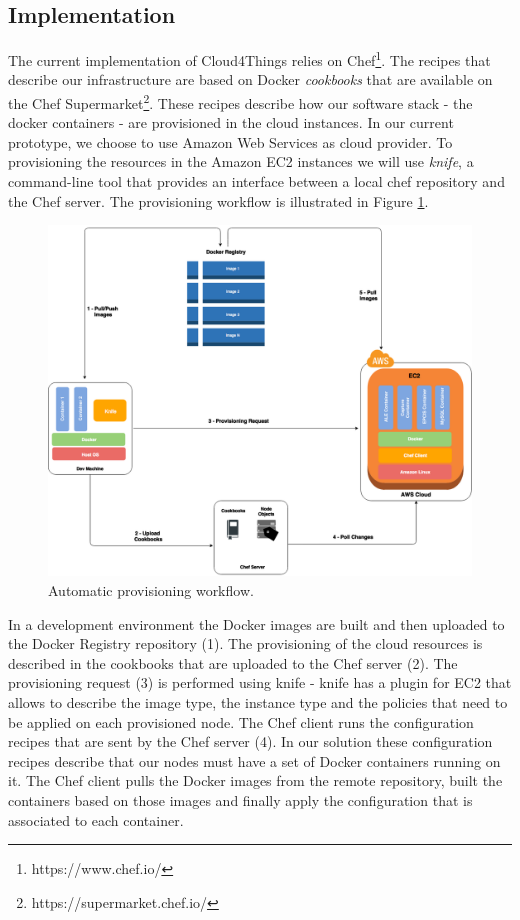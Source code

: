 \subsection{Implementation}
\label{sub:implementation}
The current implementation of Cloud4Things relies on Chef\footnote{https://www.chef.io/}. The recipes that describe our
infrastructure are based on Docker \textit{cookbooks} that are available on the Chef Supermarket\footnote{https://supermarket.chef.io/}.
These recipes describe how our software stack - the docker containers - are provisioned in the cloud instances.
In our current prototype, we choose to use Amazon Web Services as cloud provider. To provisioning the
resources in the Amazon EC2 instances we will use \textit{knife}, a command-line tool that provides
an interface between a local chef repository and the Chef server. The provisioning workflow is illustrated
in Figure \ref{fig:automatic_provisioning}.
\begin{figure}[!ht]
  \centering
  \includegraphics[width=\textwidth]{images/docker-c4t}
  \caption{Automatic provisioning workflow.}
  \label{fig:automatic_provisioning}
\end{figure}

In a development environment the Docker images are built and then uploaded to the Docker Registry
repository (1). The provisioning of the cloud resources is described in the cookbooks that are uploaded
to the Chef server (2). The provisioning request (3) is performed using knife - knife has a plugin for EC2
that allows to describe the image type, the instance type and the policies that need to be applied on
each provisioned node. The Chef client runs the configuration recipes that are sent by the Chef server (4).
In our solution these configuration recipes describe that our nodes must have a set of Docker containers
running on it. The Chef client pulls the Docker images from the remote repository, built the
containers based on those images and finally apply the configuration that is associated to each container.

